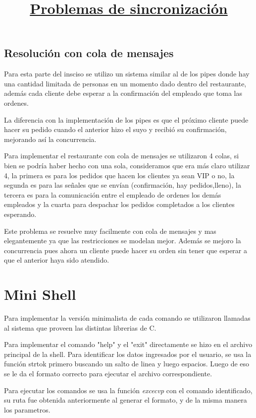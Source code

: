\documentclass[11pt]{article} %
\begin{document}
\subsection{Resolución con cola de mensajes}

Para esta parte del insciso se utilizo un sistema similar al de los pipes donde hay una cantidad limitada de personas en un momento dado dentro del restaurante, además cada cliente debe esperar a la confirmación del empleado que toma las ordenes.

La diferencia con la implementación de los pipes es que el próximo cliente puede hacer su pedido cuando el anterior hizo el suyo y recibió su confirmación, mejorando así la concurrencia.

Para implementar el restaurante con cola de mensajes se utilizaron 4 colas, si bien se podría haber hecho con una sola, consideramos que era más claro utilizar 4, la primera es para los pedidos que hacen los clientes ya sean VIP o no, la segunda es para las señales que se envían (confirmación, hay pedidos,lleno), la tercera es para la comunicación entre el empleado de ordenes  los demás empleados y la cuarta para despachar los pedidos completados a los clientes esperando.

Este problema se resuelve muy facilmente con cola de mensajes y mas elegantemente ya que las restricciones se modelan mejor. Además se mejoro la concurrencia pues ahora un cliente puede hacer su orden sin tener que esperar a que el anterior haya sido atendido.



\section{Mini Shell}
Para implementar la versión minimalista de cada comando se utilizaron llamadas al sistema que proveen las distintas librerias de C.

Para implementar el comando "help" y el "exit" directamente se hizo en el archivo principal de la shell. Para identificar los datos ingresados por el usuario, se usa la función strtok primero buscando un salto de linea y luego espacios. Luego de eso se le da el formato correcto para ejecutar el archivo correspondiente.

Para ejecutar los comandos se usa la función \textit{excecvp} con el comando identificado, su ruta fue obtenida anteriormente al generar el formato, y de la misma manera los parametros. \hfill \break
\title{\huge \underline{Problemas de sincronización}}
\end{document}
